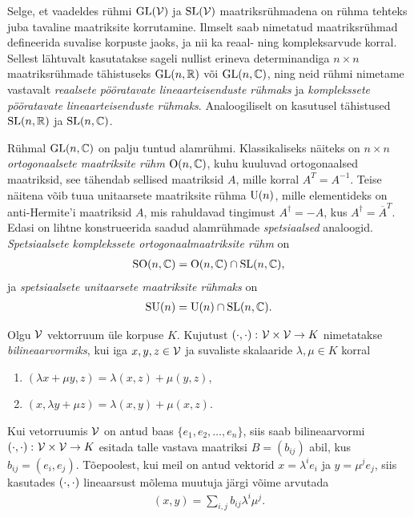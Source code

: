 Selge, et vaadeldes rühmi $\operatorname{GL}(\mathcal{V})$ ja $\operatorname{SL}(\mathcal{V})$ maatriksrühmadena
on rühma tehteks juba tavaline maatriksite korrutamine. Ilmselt saab
nimetatud maatriksrühmad defineerida suvalise korpuste jaoks, ja nii ka
reaal- ning kompleksarvude korral. Sellest lähtuvalt kasutatakse sageli
nullist erineva determinandiga $n \times n$ maatriksrühmade tähistuseks
$\operatorname{GL}(n, \mathbb{R})$ või $\operatorname{GL}(n, \mathbb{C})$, ning neid rühmi nimetame vastavalt
\emph{reaalsete pööratavate lineaarteisenduste rühmaks} ja \emph{komplekssete
pööratavate lineaarteisenduste rühmaks}. Analoogiliselt on kasutusel
tähistused $\operatorname{SL}(n, \mathbb{R})$ ja $\operatorname{SL}(n, \mathbb{C})$.

Rühmal $\operatorname{GL}(n, \mathbb{C})$ on palju tuntud alamrühmi. Klassikaliseks näiteks on
$n \times n$ \emph{ortogonaalsete maatriksite rühm} $\operatorname{O}(n, \mathbb{C})$, kuhu
kuuluvad ortogonaalsed maatriksid, see tähendab sellised maatriksid $A$, mille
korral $A^T = A^{-1}$. Teise näitena võib tuua unitaarsete maatriksite rühma
$\operatorname{U}(n)$, mille elementideks on anti-Hermite'i maatriksid $A$, mis rahuldavad
tingimust $A^\dag = -A$, kus $A^\dag = \overline{A}^T$. Edasi on lihtne
konstrueerida saadud alamrühmade \emph{spetsiaalsed} analoogid.
\emph{Spetsiaalsete komplekssete ortogonaalmaatriksite rühm} on
\begin{align*}
    \operatorname{SO}(n, \mathbb{C}) = \operatorname{O}(n, \mathbb{C}) \cap \operatorname{SL}(n, \mathbb{C}),
\end{align*}
ja \emph{spetsiaalsete unitaarsete maatriksite rühmaks} on
\begin{align*}
    \operatorname{SU}(n) = \operatorname{U}(n) \cap \operatorname{SL}(n, \mathbb{C}).
\end{align*}

\begin{dfn}
    Olgu $\mathcal{V}$ vektorruum üle korpuse $K$. Kujutust
    $\left( \cdot, \cdot \right) \colon \mathcal{V} \times \mathcal{V} \to K$
    nimetatakse \emph{bilineaarvormiks}, kui iga $x, y, z \in \mathcal{V}$
    ja suvaliste skalaaride $\lambda, \mu \in K$ korral
    \begin{enumerate}[label=\roman*.]
        \item $(\lambda x + \mu y, z) = \lambda (x, z) + \mu (y, z)$,
        \item $(x, \lambda y + \mu z) = \lambda (x, y) + \mu (x, z)$.
    \end{enumerate}
\end{dfn}

Kui vetorruumis $\mathcal{V}$ on antud baas $\{e_1, e_2, \dots, e_n\}$, siis saab
bilineaarvormi $\left( \cdot, \cdot \right) \colon \mathcal{V} \times \mathcal{V} \to K$ esitada talle vastava maatriksi
$B = (b_{ij})$ abil, kus $b_{ij} = (e_i, e_j)$. Tõepoolest, kui
meil on antud vektorid $x = \lambda^i e_i$ ja $y = \mu^j e_j$,
siis kasutades $\left( \cdot, \cdot \right)$ lineaarsust mõlema muutuja järgi võime arvutada
\begin{align*}
    (x, y) = \sum_{i, j} b_{ij} \lambda^i \mu^j.
\end{align*}

